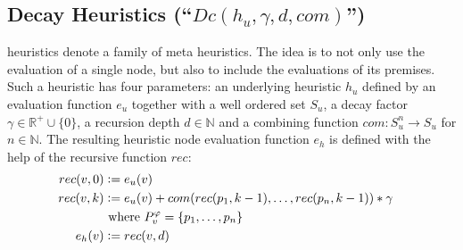 \subsection{Decay Heuristics (``$Dc(h_u,\gamma,d,com)$'') }
\label{sec:decay}
 heuristics denote a family of meta heuristics. 
The idea is to not only use the evaluation of a single node, but also to include the evaluations of its premises.
Such a heuristic has four parameters: an underlying heuristic $h_u$ defined by an evaluation function $e_u$ together with a well ordered set $S_u$, a decay factor $\gamma \in \mathbb{R}^+ \cup \{0\}$, a recursion depth $d \in \mathbb{N}$ and a combining function $com: S_u^n \rightarrow S_u$ for $n \in \mathbb{N}$.
The resulting heuristic node evaluation function $e_h$ is defined with the help of the recursive function $rec$:
\begin{align*}
	rec(v,0) &\mathrel{\mathop:}= e_u(v) \\
	rec(v,k) &\mathrel{\mathop:}= e_u(v) + com(rec(p_1,k-1),\ldots,rec(p_n,k-1)) * \gamma\\
	& \text{ where } P_{v}^{\varphi} = \{p_1,\ldots,p_n\}\\
	e_h(v) &\mathrel{\mathop:}= rec(v,d) &
\end{align*}

